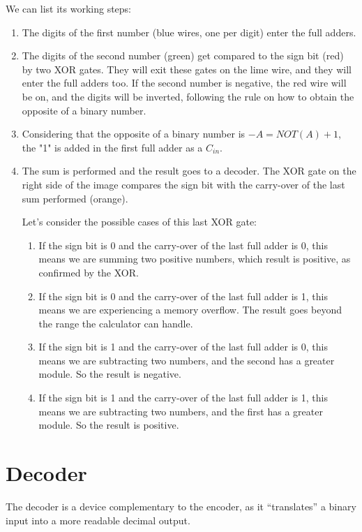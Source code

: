 \documentclass{article}
\begin{document}
We can list its working steps:
\begin{enumerate}
  \item The digits of the first number (blue wires, one per digit) enter the full adders.
  \item The digits of the second number (green) get compared to the sign bit (red) by two XOR gates. They will exit these gates on the lime wire, and they will enter the full adders too. If the second number is negative, the red wire will be on, and the digits will be inverted, following the rule on how to obtain the opposite of a binary number.
  \item Considering that the opposite of a binary number is $-A=NOT(A)+1$, the "1" is added in the first full adder as a $C_{in}$.
  \item The sum is performed and the result goes to a decoder. The XOR gate on the right side of the image compares the sign bit with the carry-over of the last sum performed (orange). 
  
    \vspace{3mm}

    Let's consider the possible cases of this last XOR gate:
  \begin{enumerate}
    \item If the sign bit is 0 and the carry-over of the last full adder is 0, this means we are summing two positive numbers, which result is positive, as confirmed by the XOR.
    \item If the sign bit is 0 and the carry-over of the last full adder is 1, this means we are experiencing a memory overflow. The result goes beyond the range the calculator can handle.
    \item If the sign bit is 1 and the carry-over of the last full adder is 0, this means we are subtracting two numbers, and the second has a greater module. So the result is negative.
    \item If the sign bit is 1 and the carry-over of the last full adder is 1, this means we are subtracting two numbers, and the first has a greater module. So the result is positive.
  \end{enumerate}
\end{enumerate}

\section{Decoder} \label{DecoderSection}

The decoder is a device complementary to the encoder, as it ``translates'' a binary input into a more readable decimal output.
\end{document}
